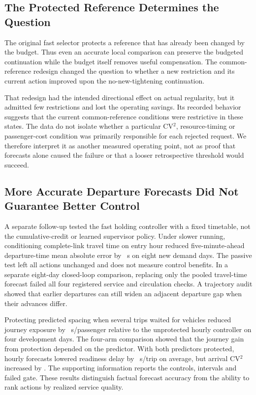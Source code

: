 \subsection{The Protected Reference Determines the Question}
The original fast selector protects a reference that has already been changed by the budget. Thus even an accurate local comparison can preserve the budgeted continuation while the budget itself removes useful compensation. The common-reference redesign changed the question to whether a new restriction and its current action improved upon the no-new-tightening continuation.

That redesign had the intended directional effect on actual regularity, but it admitted few restrictions and lost the operating savings. Its recorded behavior suggests that the current common-reference conditions were restrictive in these states. The data do not isolate whether a particular CV$^2$, resource-timing or passenger-cost condition was primarily responsible for each rejected request. We therefore interpret it as another measured operating point, not as proof that forecasts alone caused the failure or that a looser retrospective threshold would succeed.

\subsection{More Accurate Departure Forecasts Did Not Guarantee Better Control}
A separate follow-up tested the fast holding controller with a fixed timetable, not the cumulative-credit or learned supervisor policy. Under slower running, conditioning complete-link travel time on entry hour reduced five-minute-ahead departure-time mean absolute error by \ForecastMAEGain\ s on eight new demand days. The passive test left all actions unchanged and does not measure control benefits. In a separate eight-day closed-loop comparison, replacing only the pooled travel-time forecast failed all four registered service and circulation checks. A trajectory audit showed that earlier departures can still widen an adjacent departure gap when their advances differ.

Protecting predicted spacing when several trips waited for vehicles reduced journey exposure by \SpacingJourneyGain\ s/passenger relative to the unprotected hourly controller on four development days. The four-arm comparison showed that the journey gain from protection depended on the predictor. With both predictors protected, hourly forecasts lowered readiness delay by \GuardedHourlyReadinessGain\ s/trip on average, but arrival CV$^2$ increased by \GuardedHourlyArrivalLoss. The supporting information reports the controls, intervals and failed gate. These results distinguish factual forecast accuracy from the ability to rank actions by realized service quality.

